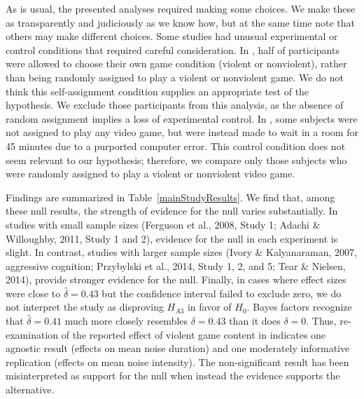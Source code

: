 \documentclass[man]{apa6}
\begin{document}
As is usual, the presented analyses required making some choices. We make these as transparently and judiciously as we know how, but at the same time note that others may make different choices. Some studies had unusual experimental or control conditions that required careful consideration. In \citet{Ferguson:etal:2008}, half of participants were allowed to choose their own game condition (violent or nonviolent), rather than being randomly assigned to play a violent or nonviolent game. We do not think this self-assignment condition supplies an appropriate test of the hypothesis. We exclude those participants from this analysis, as the absence of random assignment implies a loss of experimental control. In \citet{Ferguson:Rueda:2010}, some subjects were not assigned to play any video game, but were instead made to wait in a room for 45 minutes due to a purported computer error. This control condition does not seem relevant to our hypothesis; therefore, we compare only those subjects who were randomly assigned to play a violent or nonviolent video game. 

Findings are summarized in Table~\ref{mainStudyResults}. We find that, among these null results, the strength of evidence for the null varies substantially. In studies with small sample sizes (Ferguson et al., 2008, Study 1; Adachi \& Willoughby, 2011, Study 1 and 2), evidence for the null in each experiment is slight. 
In contrast, studies with larger sample sizes (Ivory \& Kalyanaraman, 2007, aggressive cognition; Przybylski et al., 2014, Study 1, 2, and 5; Tear \& Nielsen, 2014), \nocite{Ivory:Kalyanaraman:2007,Przybylski:etal:2014,Tear:Nielsen:2014} provide stronger evidence for the null.	Finally, in cases where effect sizes were close to $\hat{\delta} = 0.43$ but the confidence interval failed to exclude zero, we do not interpret the study as disproving $H_{A3}$ in favor of $H_0$. Bayes factors recognize that $\hat{\delta} = 0.41$ much more closely resembles $\delta = 0.43$ than it does $\delta = 0$. Thus, re-examination of the reported effect of violent game content in \citet{Elson:etal:2013} indicates one agnostic result (effects on mean noise duration) and one moderately informative replication (effects on mean noise intensity). The non-significant result has been misinterpreted as support for the null when instead the evidence supports the alternative.  
\end{document}
